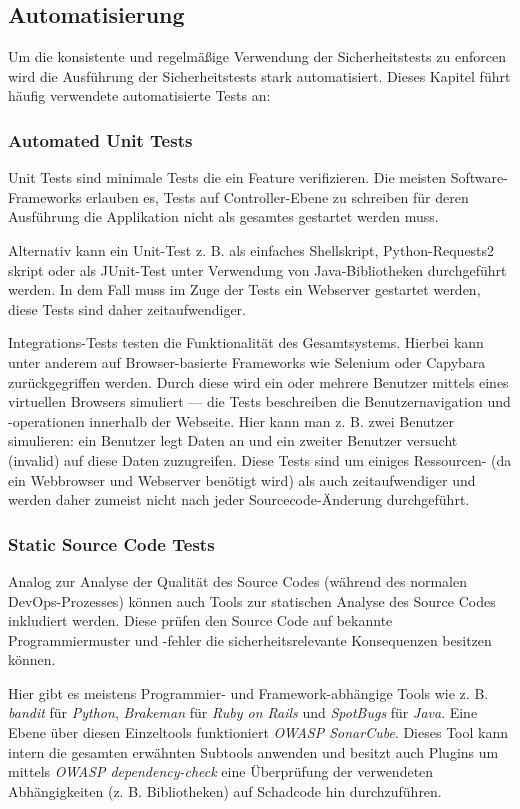 \subsection{Automatisierung}

Um die konsistente und regelmäßige Verwendung der Sicherheitstests zu enforcen wird die Ausführung der Sicherheitstests stark automatisiert. Dieses Kapitel führt häufig verwendete automatisierte Tests an:

\subsubsection{Automated Unit Tests}

Unit Tests sind minimale Tests die ein Feature verifizieren. Die meisten Software-Frameworks erlauben es, Tests auf Controller-Ebene zu schreiben für deren Ausführung die Applikation nicht als gesamtes gestartet werden muss.

Alternativ kann ein Unit-Test z. B. als einfaches Shellskript, Python-Requests2 skript oder als JUnit-Test unter Verwendung von Java-Bibliotheken durchgeführt werden. In dem Fall muss im Zuge der Tests ein Webserver gestartet werden, diese Tests sind daher zeitaufwendiger.

Integrations-Tests testen die Funktionalität des Gesamtsystems. Hierbei kann unter anderem auf Browser-basierte Frameworks wie Selenium oder Capybara zurückgegriffen werden. Durch diese wird ein oder mehrere Benutzer mittels eines virtuellen Browsers simuliert --- die Tests beschreiben die Benutzernavigation und -operationen innerhalb der Webseite. Hier kann man z. B. zwei Benutzer simulieren: ein Benutzer legt Daten an und ein zweiter Benutzer versucht (invalid) auf diese Daten zuzugreifen. Diese Tests sind um einiges Ressourcen- (da ein Webbrowser und Webserver benötigt wird) als auch zeitaufwendiger und werden daher zumeist nicht nach jeder Sourcecode-Änderung durchgeführt.

\subsubsection{Static Source Code Tests}

Analog zur Analyse der Qualität des Source Codes (während des normalen DevOps-Prozesses) können auch Tools zur statischen Analyse des Source Codes inkludiert werden. Diese prüfen den Source Code auf bekannte Programmiermuster und -fehler die sicherheitsrelevante Konsequenzen besitzen können.

Hier gibt es meistens Programmier- und Framework-abhängige Tools wie z. B. \textit{bandit} für \textit{Python}, \textit{Brakeman} für \textit{Ruby on Rails} und \textit{SpotBugs} für \textit{Java}. Eine Ebene über diesen Einzeltools funktioniert \textit{OWASP SonarCube}. Dieses Tool kann intern die gesamten erwähnten Subtools anwenden und besitzt auch Plugins um mittels \textit{OWASP dependency-check} eine Überprüfung der verwendeten Abhängigkeiten (z. B. Bibliotheken) auf Schadcode hin durchzuführen.

